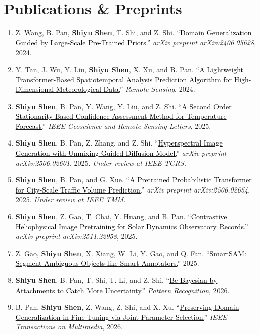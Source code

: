 \documentclass[10pt,a4paper]{article}
\newcommand{\me}{\textbf{Shiyu Shen}}
\newcommand{\status}[1]{\textcolor{slate}{\textit{#1}}}
\newcommand{\papertitle}[2]{\href{#1}{\textcolor{black}{#2}}}
\begin{document}
\section{Publications \& Preprints}
\begin{enumerate}
  \item Z. Wang, B. Pan, \me, T. Shi, and Z. Shi. ``\papertitle{https://arxiv.org/abs/2406.05628}{Domain Generalization Guided by Large-Scale Pre-Trained Priors.}'' \textit{arXiv preprint arXiv:2406.05628}, 2024.
  \item Y. Tan, J. Wu, Y. Liu, \me, X. Xu, and B. Pan. ``\papertitle{https://doi.org/10.3390/rs16234545}{A Lightweight Transformer-Based Spatiotemporal Analysis Prediction Algorithm for High-Dimensional Meteorological Data.}'' \textit{Remote Sensing}, 2024.
  \item \me, B. Pan, Y. Wang, Y. Liu, and Z. Shi. ``\papertitle{https://ieeexplore.ieee.org/document/10852282}{A Second Order Stationarity Based Confidence Assessment Method for Temperature Forecast.}'' \textit{IEEE Geoscience and Remote Sensing Letters}, 2025.
  \item \me, B. Pan, Z. Zhang, and Z. Shi. ``\papertitle{https://arxiv.org/abs/2506.02601}{Hyperspectral Image Generation with Unmixing Guided Diffusion Model.}'' \textit{arXiv preprint arXiv:2506.02601}, 2025. \status{Under review at IEEE TGRS.}
  \item \me, B. Pan, and G. Xue. ``\papertitle{https://arxiv.org/abs/2506.02654}{A Pretrained Probabilistic Transformer for City-Scale Traffic Volume Prediction.}'' \textit{arXiv preprint arXiv:2506.02654}, 2025. \status{Under review at IEEE TMM.}
  \item \me, Z. Gao, T. Chai, Y. Huang, and B. Pan. ``\papertitle{https://arxiv.org/abs/2511.22958}{Contrastive Heliophysical Image Pretraining for Solar Dynamics Observatory Records.}'' \textit{arXiv preprint arXiv:2511.22958}, 2025.
  \item Z. Gao, \me, X. Xiang, W. Li, Y. Gao, and Q. Fan. ``\papertitle{https://openreview.net/forum?id=08pxmTLKTT}{SmartSAM: Segment Ambiguous Objects like Smart Annotators.}'' 2025.
  \item \me, B. Pan, T. Shi, T. Li, and Z. Shi. ``\papertitle{https://doi.org/10.1016/j.patcog.2026.113084}{Be Bayesian by Attachments to Catch More Uncertainty.}'' \textit{Pattern Recognition}, 2026.
  \item B. Pan, \me, Z. Wang, Z. Shi, and X. Xu. ``\papertitle{https://arxiv.org/abs/2508.16976}{Preserving Domain Generalization in Fine-Tuning via Joint Parameter Selection.}'' \textit{IEEE Transactions on Multimedia}, 2026.

\end{enumerate}
\end{document}
